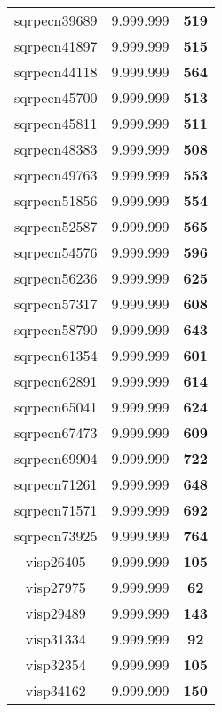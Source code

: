 \begin{tabular}{cc||c}
sqrpecn39689     & 9.999.999        & {\bf 519}       \\ 
sqrpecn41897     & 9.999.999        & {\bf 515}       \\ 
sqrpecn44118     & 9.999.999        & {\bf 564}       \\ 
sqrpecn45700     & 9.999.999        & {\bf 513}       \\ 
sqrpecn45811     & 9.999.999        & {\bf 511}       \\ 
sqrpecn48383     & 9.999.999        & {\bf 508}       \\ 
sqrpecn49763     & 9.999.999        & {\bf 553}       \\ 
sqrpecn51856     & 9.999.999        & {\bf 554}       \\ 
sqrpecn52587     & 9.999.999        & {\bf 565}       \\ 
sqrpecn54576     & 9.999.999        & {\bf 596}       \\ 
sqrpecn56236     & 9.999.999        & {\bf 625}       \\ 
sqrpecn57317     & 9.999.999        & {\bf 608}       \\ 
sqrpecn58790     & 9.999.999        & {\bf 643}       \\ 
sqrpecn61354     & 9.999.999        & {\bf 601}       \\ 
sqrpecn62891     & 9.999.999        & {\bf 614}       \\ 
sqrpecn65041     & 9.999.999        & {\bf 624}       \\ 
sqrpecn67473     & 9.999.999        & {\bf 609}       \\ 
sqrpecn69904     & 9.999.999        & {\bf 722}       \\ 
sqrpecn71261     & 9.999.999        & {\bf 648}       \\ 
sqrpecn71571     & 9.999.999        & {\bf 692}       \\ 
sqrpecn73925     & 9.999.999        & {\bf 764}       \\ 
visp26405        & 9.999.999        & {\bf 105}       \\ 
visp27975        & 9.999.999        & {\bf 62}        \\ 
visp29489        & 9.999.999        & {\bf 143}       \\ 
visp31334        & 9.999.999        & {\bf 92}        \\ 
visp32354        & 9.999.999        & {\bf 105}       \\ 
visp34162        & 9.999.999        & {\bf 150}       \\ 

\end{tabular}
